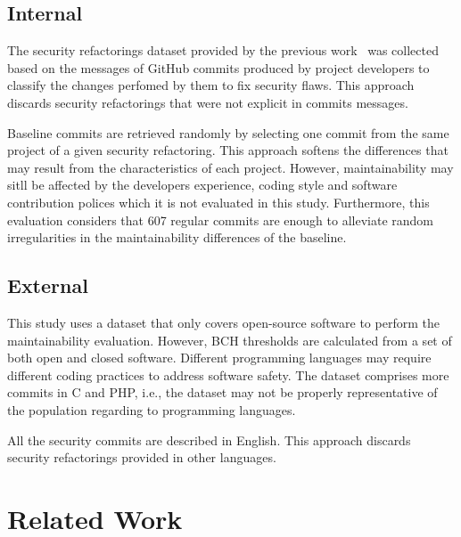 \documentclass[10pt,conference]{IEEEtran}
\newcommand{\Sof}[1]{\textbf{[Sofia:[}{\color{red} #1}\textbf{]]}}
\newcommand{\Luis}[1]{\textbf{[Luis:[}{\color{green} #1}\textbf{]]}}
\begin{document}
{\subsection{Internal}

The security refactorings dataset provided by the previous work~\cite{Reis:2017:IJSSE}
was collected based on the messages of GitHub commits produced by project developers
to classify the changes perfomed by them to fix security flaws. This approach
discards security refactorings that were not explicit in commits messages.

Baseline commits are retrieved randomly by selecting one commit from the same
project of a given security refactoring. This approach softens the differences
that may result from the characteristics of each project. However,
maintainability may sitll be affected by the developers experience, coding
style and software contribution polices which it is not evaluated in this
study. Furthermore, this evaluation considers that 607 regular commits are
enough to alleviate random irregularities in the maintainability differences of
the baseline.

\subsection{External}


This study uses a dataset that only covers
open-source software to perform the maintainability evaluation. However, BCH
thresholds are calculated from a set of both open and closed software.
Different programming languages may require different coding practices to
address software safety. The dataset comprises more commits in C and PHP, i.e.,
the dataset may not be properly representative of the population regarding to programming languages.

All the security commits are described in English. This approach discards
security refactorings provided in other languages.

\section{Related Work}\label{sec:rw}


}
\end{document}
